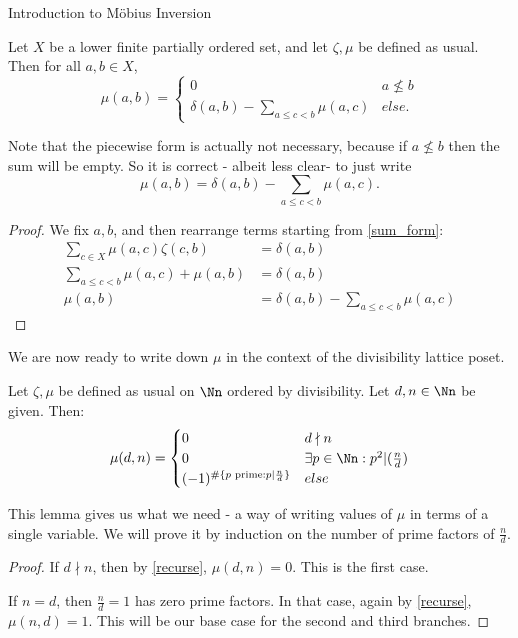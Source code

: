 \documentclass[12pt]{pom_thesis}
\begin{document}
\begin{chapter}{Introduction to M\"obius Inversion}
\begin{lemma}\label{recurse}
Let $X$ be a lower finite partially ordered set, and let $\zeta, \mu$ be defined as usual. Then for all $a, b \in X$,
\[
\mu(a,b) = 
\begin{cases}
0 & a \nleq b\\
\delta(a,b)-\sum_{a \leq c < b}\mu(a,c) & else.
\end{cases}
\]
\end{lemma}
\begin{rmk}
Note that the piecewise form is actually not necessary, because if $a \nleq b$ then the sum will be empty. So it is correct - albeit less clear- to just write
\[
\mu(a,b) = \delta(a,b)-\sum_{a \leq c < b}\mu(a,c).
\]
\end{rmk}
\begin{proof}
We fix $a,b$, and then rearrange terms starting from \ref{sum_form}:
\begin{align*}
\sum_{c \in X}\mu(a,c) \zeta(c,b) &= \delta(a,b)\\
\sum_{a \leq c < b} \mu(a,c) + \mu(a,b) &= \delta(a,b)\\
\mu(a,b) &= \delta(a,b) - \sum_{a \leq c < b} \mu(a,c) 
\end{align*}
\end{proof}
We are now ready to write down $\mu$ in the context of the divisibility lattice poset. 

\begin{lemma}\label{nfact}
Let $\zeta, \mu$ be defined as usual on $\Nn$ ordered by divisibility. Let $d,n \in \Nn$ be given.  Then:
\[
\mu(d,n) =
\begin{cases}
0 & d\nmid n\\
0 & \exists p \in \Nn: p^2|(\frac nd )\\
(-1)^{\#\{p \text{ prime}: p|\frac nd\}} & else
\end{cases}
\]
\end{lemma}
This lemma gives us what we need - a way of writing values of $\mu$ in terms of a single variable. We will prove it by induction on the number of prime factors of $\frac nd$.
\begin{proof} %
If $d \nmid n$, then by \ref{recurse}, $\mu(d,n) = 0$. This is the first case.

If $n = d$, then $\frac nd=1$ has zero prime factors. In that case, again by \ref{recurse}, $\mu(n,d) = 1$. This will be our base case for the second and third branches.


\end{proof}
\end{chapter}
\end{document}
